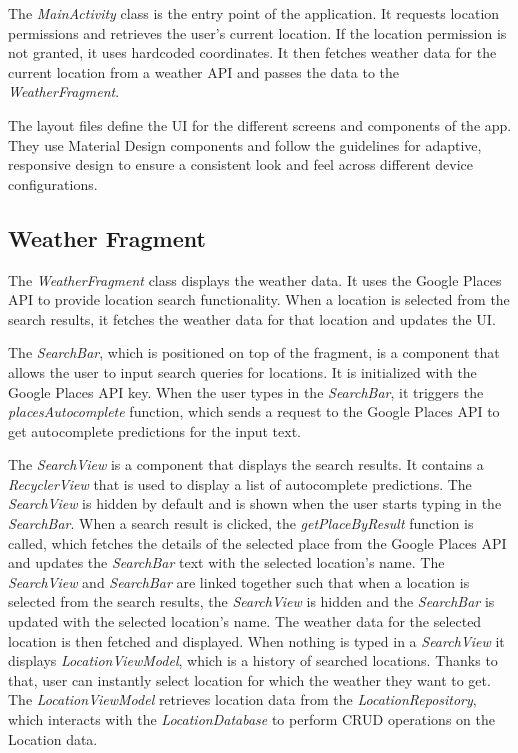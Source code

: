 The \textit{MainActivity} class is the entry point of the application. It requests location permissions and retrieves the user's current location. If the location permission is not granted, it uses hardcoded coordinates. It then fetches weather data for the current location from a weather API and passes the data to the \textit{WeatherFragment}.

The layout files define the UI for the different screens and components of the app. They use Material Design components and follow the guidelines for adaptive, responsive design to ensure a consistent look and feel across different device configurations.

\subsection{Weather Fragment}

The \textit{WeatherFragment} class displays the weather data. It uses the Google Places API to provide location search functionality. When a location is selected from the search results, it fetches the weather data for that location and updates the UI.

The \textit{SearchBar}, which is positioned on top of the fragment, is a component that allows the user to input search queries for locations. It is initialized with the Google Places API key. When the user types in the \textit{SearchBar}, it triggers the \textit{placesAutocomplete} function, which sends a request to the Google Places API to get autocomplete predictions for the input text. 

The \textit{SearchView} is a component that displays the search results. It contains a \textit{RecyclerView} that is used to display a list of autocomplete predictions. The \textit{SearchView} is hidden by default and is shown when the user starts typing in the \textit{SearchBar}. When a search result is clicked, the \textit{getPlaceByResult} function is called, which fetches the details of the selected place from the Google Places API and updates the \textit{SearchBar} text with the selected location's name. The \textit{SearchView} and \textit{SearchBar} are linked together such that when a location is selected from the search results, the \textit{SearchView} is hidden and the \textit{SearchBar} is updated with the selected location's name. The weather data for the selected location is then fetched and displayed. When nothing is typed in a \textit{SearchView} it displays \textit{LocationViewModel}, which is a history of searched locations. Thanks to that, user can instantly select location for which the weather they want to get. The \textit{LocationViewModel} retrieves location data from the \textit{LocationRepository}, which interacts with the \textit{LocationDatabase} to perform CRUD operations on the Location data. 

